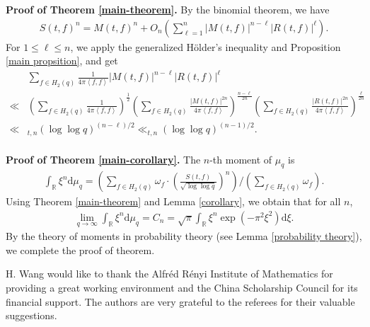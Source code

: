 \documentclass[11pt,reqno]{amsart}
\newcommand{\bna}{\begin{eqnarray*}}
\newcommand{\ena}{\end{eqnarray*}}
\numberwithin{equation}{section}
\theoremstyle{plain}
\theoremstyle{definition}
\begin{document}
\noindent\textbf{Proof of Theorem \ref{main-theorem}.}
By the binomial theorem, we have
\begin{equation*}
\begin{split}
S(t,f)^n=M(t,f)^n+O_n\left(\sum_{\ell=1}^n|M(t,f)|^{n-\ell}|R(t,f)|^{\ell}\right).
\end{split}
\end{equation*}
For $1\leq\ell\leq n$, we apply the generalized H\"{o}lder's inequality and Proposition \ref{main propsition}, and get
\begin{equation*}
\begin{split}
&\sum_{f\in H_2(q)}\frac{1}{4\pi \left<f,f\right>}|M(t,f)|^{n-\ell}|R(t,f)|^{\ell}\\
\ll &\left(\sum_{f\in H_2(q)}\frac{1}{4\pi \left<f,f\right>}\right)^{\frac{1}{2}}
\left(\sum_{f\in H_2(q)}\frac{|M(t,f)|^{2n}}{4\pi \left<f,f\right>}\right)^{\frac{n-\ell}{2n}}
\left(\sum_{f\in H_2(q)}\frac{|R(t,f)|^{2n}}{4\pi \left<f,f\right>}\right)^{\frac{\ell}{2n}}\\
\ll&_{t,n}(\log\log q)^{(n-\ell)/2}\ll_{t,n}(\log\log q)^{(n-1)/2}.
\end{split}
\end{equation*}
\\
\noindent\textbf{Proof of Theorem \ref{main-corollary}.}
The $n$-th moment of $\mu_q$ is
\begin{align*}
\int_{\mathbb{R}}\xi^n\mathrm{d}\mu_q=\left(
\sum_{f\in H_2(q)}\omega_f\cdot\left(\frac{S(t,f)}{\sqrt{\log\log q}}\right)^n\right)\bigg/
\left(\sum_{f\in H_2(q)}\omega_f\right).
\end{align*}
Using Theorem \ref{main-theorem} and Lemma \ref{corollary}, we obtain that for all $n$,
\bna
\lim_{q\rightarrow \infty}\int_{\mathbb{R}}\xi^n\mathrm{d}\mu_q=C_n=
\sqrt{\pi}\int_{\mathbb{R}}\xi^n \exp(-\pi^2\xi^2)\mathrm{d}\xi.
\ena
By the theory of moments in probability theory (see Lemma \ref{probability theory}),
we complete the proof of theorem.


\bigskip
{}
H. Wang would like to thank the Alfr\'{e}d R\'{e}nyi Institute of Mathematics for providing a great working environment
and the China Scholarship Council for its financial support.
The authors are very grateful to the
referees for their valuable suggestions.
\end{document}
